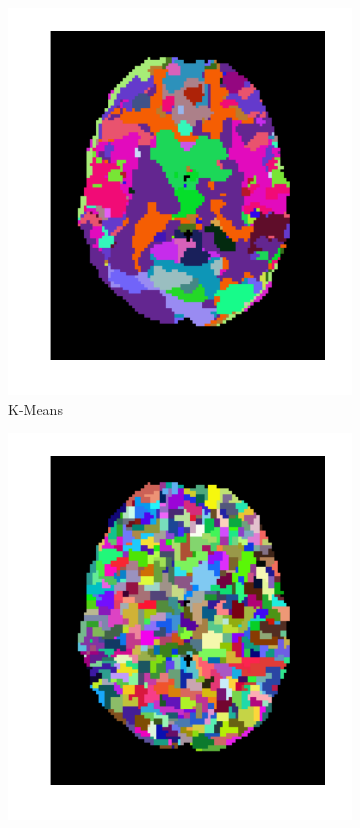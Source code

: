 \documentclass{frontiersSCNS} %
\begin{document}
\begin{figure}[hbtp]
  \begin{center}
      \begin{subfigure}[b]{.23\linewidth}
          \includegraphics[width=\linewidth]{img/clustering/kmeans}
        \caption{K-Means}
      \end{subfigure}
      \begin{subfigure}[b]{.23\linewidth}
        \includegraphics[width=\linewidth]{img/clustering/ward}

\end{subfigure}
\end{center}
\end{figure}
\end{document}
